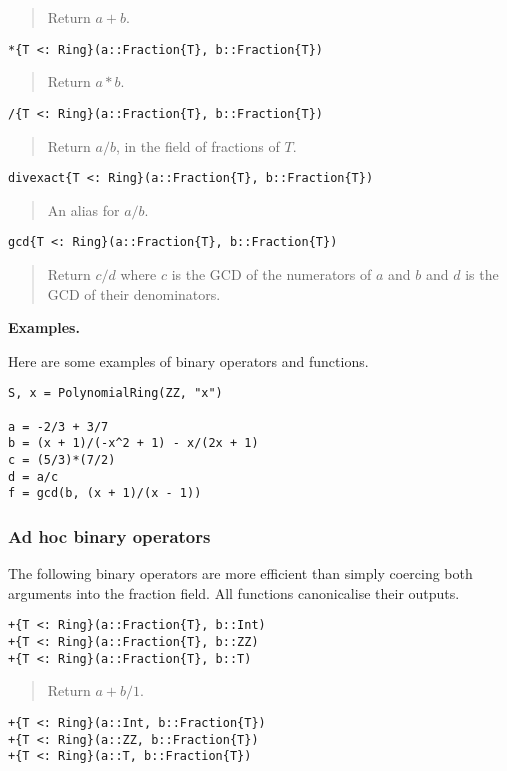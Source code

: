 \documentclass[a4paper,10pt]{article}
\newcommand{\desc}[1]{\vspace{-3mm}\begin{quote}#1\end{quote}}
\begin{document}
{{{\desc{Return $a + b$.}

\begin{lstlisting}
*{T <: Ring}(a::Fraction{T}, b::Fraction{T})
\end{lstlisting}

\desc{Return $a*b$.}

\begin{lstlisting}
/{T <: Ring}(a::Fraction{T}, b::Fraction{T})
\end{lstlisting}

\desc{Return $a/b$, in the field of fractions of $T$.}

\begin{lstlisting}
divexact{T <: Ring}(a::Fraction{T}, b::Fraction{T})
\end{lstlisting}

\desc{An alias for $a/b$.}

\begin{lstlisting}
gcd{T <: Ring}(a::Fraction{T}, b::Fraction{T})
\end{lstlisting}

\desc{Return $c/d$ where $c$ is the GCD of the numerators of $a$ and $b$ and
$d$ is the GCD of their denominators.}

\textbf{Examples.}

Here are some examples of binary operators and functions.

\begin{lstlisting}
S, x = PolynomialRing(ZZ, "x")

a = -2/3 + 3/7
b = (x + 1)/(-x^2 + 1) - x/(2x + 1)
c = (5/3)*(7/2)
d = a/c
f = gcd(b, (x + 1)/(x - 1))
\end{lstlisting}

\subsubsection{Ad hoc binary operators}

The following binary operators are more efficient than simply coercing both
arguments into the fraction field. All functions canonicalise their outputs.

\begin{lstlisting}
+{T <: Ring}(a::Fraction{T}, b::Int)
+{T <: Ring}(a::Fraction{T}, b::ZZ)
+{T <: Ring}(a::Fraction{T}, b::T)
\end{lstlisting}

\desc{Return $a + b/1$.}

\begin{lstlisting}
+{T <: Ring}(a::Int, b::Fraction{T})
+{T <: Ring}(a::ZZ, b::Fraction{T})
+{T <: Ring}(a::T, b::Fraction{T})
\end{lstlisting}

}}}
\end{document}
